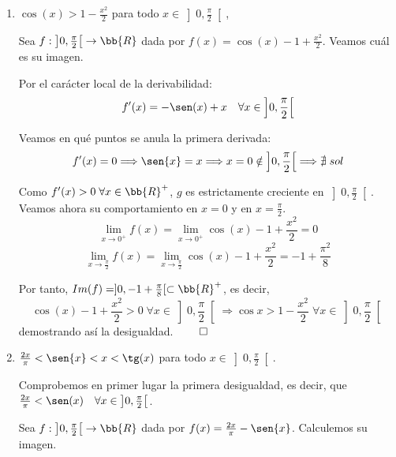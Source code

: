 \begin{ejercicio}
\begin{enumerate}
        Por tanto, $Im(g)=\bb{R}^-$, es decir,
        $$\ln(1+x) - x <0 \;\forall x\in \bb{R}^+ \Longrightarrow \ln(1+x) < x \;\forall x\in \bb{R}^+ $$
        demostrando así la segunda desigualdad.

        Por tanto, se han demostrado las dos desigualdades. $\hfill \qed$

        \item $\cos(x) > 1-\frac{x^2}{2}$ \quad para todo $x \in \left]0, \frac{\pi}{2} \right[$,
        
        Sea $f:\left]0, \frac{\pi}{2} \right[ \to \bb{R}$ dada por $f(x)=\cos(x) - 1+\frac{x^2}{2}$. Veamos cuál es su imagen.

        Por el carácter local de la derivabilidad:
        $$f'(x)=-\sen(x)+x \quad \forall x \in \left]0, \frac{\pi}{2} \right[$$

        Veamos en qué puntos se anula la primera derivada:
        $$f'(x)=0 \Longrightarrow \sen{x}=x \Longrightarrow x=0 \notin \left]0, \frac{\pi}{2} \right[ \Longrightarrow \nexists \;sol$$

        Como $f'(x)>0 \; \forall x\in \bb{R}^+$, $g$ es estrictamente creciente en $\left]0, \frac{\pi}{2} \right[$. Veamos ahora su comportamiento en $x=0$ y en $x=\frac{\pi}{2}$.
        \begin{equation*}
            \lim_{x\to0^+}f(x)=\lim_{x\to0^+} \cos(x) - 1+\frac{x^2}{2} = 0
        \end{equation*}
        \begin{equation*}
            \lim_{x\to\frac{\pi}{2}}f(x)=\lim_{x\to\frac{\pi}{2}} \cos(x) - 1+\frac{x^2}{2} = -1+\frac{\pi^2}{8}
        \end{equation*}

        Por tanto, $Im(f)=]0,-1+\frac{\pi}{8}[ \subset \bb{R}^+$, es decir,
        $$\cos(x) - 1+\frac{x^2}{2} >0 \;\forall x\in \left]0, \frac{\pi}{2} \right[ \Longrightarrow \cos{x} > 1-\frac{x^2}{2} \;\forall x\in \left]0, \frac{\pi}{2} \right[ $$
        demostrando así la desigualdad. $\hfill \qed$

        \item $\frac{2x}{\pi} < \sen{x} < x < \tg (x)$ \quad para todo $x \in \left]0, \frac{\pi}{2} \right[$.

        Comprobemos en primer lugar la primera desigualdad, es decir, que $\frac{2x}{\pi} < \sen(x) \quad \forall x \in \left]0, \frac{\pi}{2} \right[$.
        
        Sea $f:\left]0, \frac{\pi}{2} \right[\to \bb{R}$ dada por $f(x)=\frac{2x}{\pi} - \sen{x}$. Calculemos su imagen.


\end{enumerate}
\end{ejercicio}
